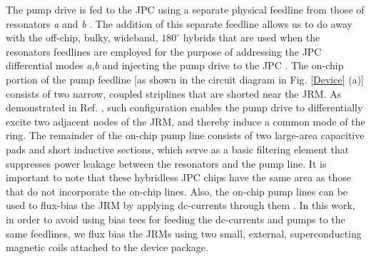 \documentclass[aip,onecolumn,10pt]{revtex4}%
\begin{document}
The pump drive is fed to the JPC using a separate physical feedline from those of resonators \textit{a} and \textit{b} \cite{hybridLessJPC}. The addition of this separate feedline allows us to do away with the off-chip, bulky, wideband, $180^{\circ}$ hybrids that are used when the resonators feedlines are employed for the purpose of addressing the JPC differential modes \textit{a},\textit{b} and injecting the pump drive to the JPC \cite{JPCreview}. The on-chip portion of the pump feedline [as shown in the circuit diagram in Fig. \ref{Device} (a)] consists of two narrow, coupled striplines that are shorted near the JRM. As demonstrated in Ref. \cite{hybridLessJPC}, such configuration enables the pump drive to differentially excite two adjacent nodes of the JRM, and thereby induce a common mode of the ring. The remainder of the on-chip pump line consists of two large-area capacitive pads and short inductive sections, which serve as a basic filtering element that suppresses power leakage between the resonators and the pump line. It is important to note that these hybridless JPC chips have the same area as those that do not incorporate the on-chip lines. Also, the on-chip pump lines can be used to flux-bias the JRM by applying dc-currents through them \cite{hybridLessJPC}. In this work, in order to avoid using bias tees for feeding the dc-currents and pumps to the same feedlines, we flux bias the JRMs using two small, external, superconducting magnetic coils attached to the device package. 
\end{document}
